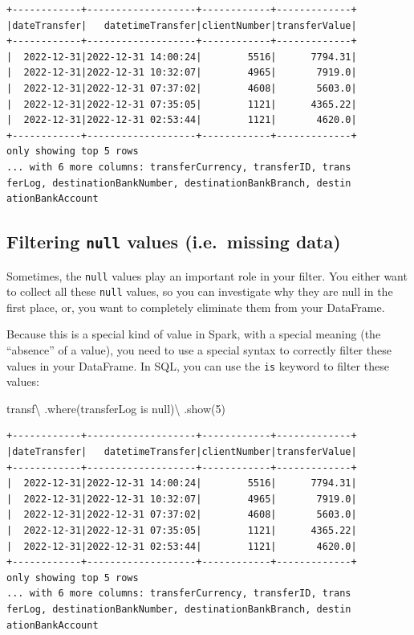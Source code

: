 \documentclass[
  11pt,
  letterpaper,
  DIV=11,
  numbers=noendperiod]{scrreprt}
\newenvironment{Shaded}{\begin{snugshade}}{\end{snugshade}}
\newcommand{\DecValTok}[1]{\textcolor[rgb]{0.68,0.00,0.00}{#1}}
\newcommand{\NormalTok}[1]{\textcolor[rgb]{0.00,0.23,0.31}{#1}}
\newcommand{\OperatorTok}[1]{\textcolor[rgb]{0.37,0.37,0.37}{#1}}
\newcommand{\StringTok}[1]{\textcolor[rgb]{0.13,0.47,0.30}{#1}}
\begin{document}
\begin{verbatim}
+------------+-------------------+------------+-------------+
|dateTransfer|   datetimeTransfer|clientNumber|transferValue|
+------------+-------------------+------------+-------------+
|  2022-12-31|2022-12-31 14:00:24|        5516|      7794.31|
|  2022-12-31|2022-12-31 10:32:07|        4965|       7919.0|
|  2022-12-31|2022-12-31 07:37:02|        4608|       5603.0|
|  2022-12-31|2022-12-31 07:35:05|        1121|      4365.22|
|  2022-12-31|2022-12-31 02:53:44|        1121|       4620.0|
+------------+-------------------+------------+-------------+
only showing top 5 rows
... with 6 more columns: transferCurrency, transferID, trans
ferLog, destinationBankNumber, destinationBankBranch, destin
ationBankAccount
\end{verbatim}

\subsection{\texorpdfstring{Filtering \texttt{null} values (i.e.~missing
data)}{Filtering null values (i.e.~missing data)}}\label{sec-filter-null-values}

Sometimes, the \texttt{null} values play an important role in your
filter. You either want to collect all these \texttt{null} values, so
you can investigate why they are null in the first place, or, you want
to completely eliminate them from your DataFrame.

Because this is a special kind of value in Spark, with a special meaning
(the ``absence'' of a value), you need to use a special syntax to
correctly filter these values in your DataFrame. In SQL, you can use the
\texttt{is} keyword to filter these values:

\begin{Shaded}
\begin{Highlighting}[]
\NormalTok{transf}\OperatorTok{\textbackslash{}}
\NormalTok{  .where(}\StringTok{\textquotesingle{}transferLog is null\textquotesingle{}}\NormalTok{)}\OperatorTok{\textbackslash{}}
\NormalTok{  .show(}\DecValTok{5}\NormalTok{)}
\end{Highlighting}
\end{Shaded}

\begin{verbatim}
+------------+-------------------+------------+-------------+
|dateTransfer|   datetimeTransfer|clientNumber|transferValue|
+------------+-------------------+------------+-------------+
|  2022-12-31|2022-12-31 14:00:24|        5516|      7794.31|
|  2022-12-31|2022-12-31 10:32:07|        4965|       7919.0|
|  2022-12-31|2022-12-31 07:37:02|        4608|       5603.0|
|  2022-12-31|2022-12-31 07:35:05|        1121|      4365.22|
|  2022-12-31|2022-12-31 02:53:44|        1121|       4620.0|
+------------+-------------------+------------+-------------+
only showing top 5 rows
... with 6 more columns: transferCurrency, transferID, trans
ferLog, destinationBankNumber, destinationBankBranch, destin
ationBankAccount
\end{verbatim}
\end{document}
